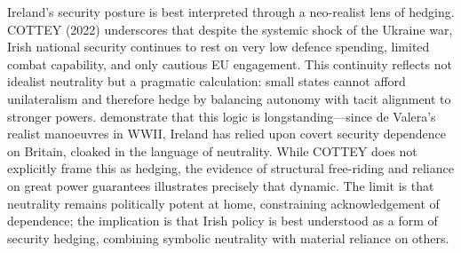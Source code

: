 \nocite{COTTEY_2022}Ireland’s security posture is best interpreted through a neo-realist lens of hedging. COTTEY (2022) underscores that despite the systemic shock of the Ukraine war, Irish national security continues to rest on very low defence spending, limited combat capability, and only cautious EU engagement. This continuity reflects not idealist neutrality but a pragmatic calculation: small states cannot afford unilateralism and therefore hedge by balancing autonomy with tacit alignment to stronger powers. \parencite{FANNING_2015,AYIOTIS_2023} demonstrate that this logic is longstanding—since de Valera’s realist manoeuvres in WWII, Ireland has relied upon covert security dependence on Britain, cloaked in the language of neutrality. While COTTEY does not explicitly frame this as hedging, the evidence of structural free-riding and reliance on great power guarantees illustrates precisely that dynamic. The limit is that neutrality remains politically potent at home, constraining acknowledgement of dependence; the implication is that Irish policy is best understood as a form of security hedging, combining symbolic neutrality with material reliance on others.


